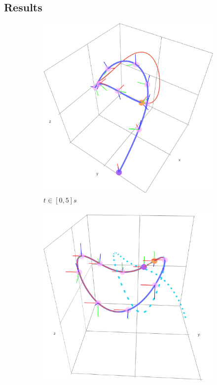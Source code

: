 \subsection{Results}
\begin{figure}[ht!]
    \centering
    \begin{subfigure}[b]{0.32\textwidth}
        \centering
        \includegraphics[width=\textwidth]{figures/vf_automatica_1.pdf} %
        \caption{$t\in[0, 5]s$}
        \label{fig:vfplot-first}
    \end{subfigure}
    \hfill
    \begin{subfigure}[b]{0.32\textwidth}
        \centering
        \includegraphics[width=\textwidth]{figures/vf_automatica_2.pdf} %

\end{subfigure}
\end{figure}

